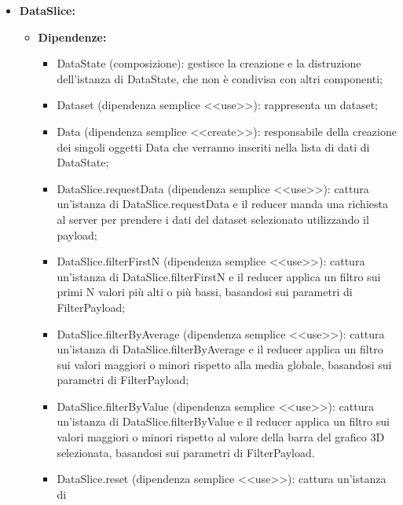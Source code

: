 \begin{itemize}
      \item \textbf{DataSlice:}
            \begin{itemize}
                  \item \textbf{Dipendenze:}
                        \begin{itemize}
                              \item DataState (composizione): gestisce la creazione e la distruzione dell'istanza
                                    di DataState, che non è condivisa con altri componenti;
                              \item Dataset (dipendenza semplice <<use>>): rappresenta un dataset;
                              \item Data (dipendenza semplice <<create>>): responsabile della creazione dei singoli
                                    oggetti Data che verranno inseriti nella lista di dati di DataState;
                              \item DataSlice.requestData (dipendenza semplice <<use>>): cattura un'istanza di
                                    DataSlice.requestData e il reducer manda una richiesta al server per prendere i
                                    dati del dataset selezionato utilizzando il payload;
                              \item DataSlice.filterFirstN (dipendenza semplice <<use>>): cattura un'istanza di
                                    DataSlice.filterFirstN e il reducer applica un filtro sui primi N valori più
                                    alti o più bassi, basandosi sui parametri di FilterPayload;
                              \item DataSlice.filterByAverage (dipendenza semplice <<use>>): cattura un'istanza di
                                    DataSlice.filterByAverage e il reducer applica un filtro sui valori maggiori o
                                    minori rispetto alla media globale, basandosi sui parametri di FilterPayload;
                              \item DataSlice.filterByValue (dipendenza semplice <<use>>): cattura un'istanza di
                                    DataSlice.filterByValue e il reducer applica un filtro sui valori maggiori o
                                    minori rispetto al valore della barra del grafico 3D selezionata, basandosi sui
                                    parametri di FilterPayload.
                              \item DataSlice.reset (dipendenza semplice <<use>>): cattura un'istanza di

\end{itemize}
\end{itemize}
\end{itemize}
